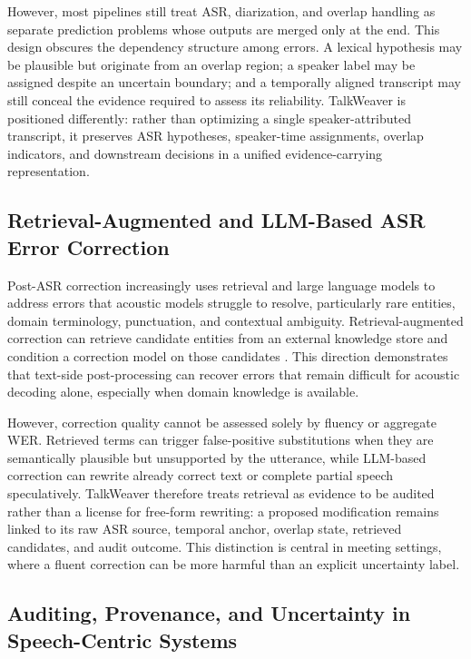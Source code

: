 \documentclass[10pt,twocolumn]{article}
\begin{document}
However, most pipelines still treat ASR, diarization, and overlap handling as separate prediction problems whose outputs are merged only at the end. This design obscures the dependency structure among errors. A lexical hypothesis may be plausible but originate from an overlap region; a speaker label may be assigned despite an uncertain boundary; and a temporally aligned transcript may still conceal the evidence required to assess its reliability. TalkWeaver is positioned differently: rather than optimizing a single speaker-attributed transcript, it preserves ASR hypotheses, speaker-time assignments, overlap indicators, and downstream decisions in a unified evidence-carrying representation.

\subsection{Retrieval-Augmented and LLM-Based ASR Error Correction}

Post-ASR correction increasingly uses retrieval and large language models to address errors that acoustic models struggle to resolve, particularly rare entities, domain terminology, punctuation, and contextual ambiguity. Retrieval-augmented correction can retrieve candidate entities from an external knowledge store and condition a correction model on those candidates \cite{pusateri2024retrieval}. This direction demonstrates that text-side post-processing can recover errors that remain difficult for acoustic decoding alone, especially when domain knowledge is available.

However, correction quality cannot be assessed solely by fluency or aggregate WER. Retrieved terms can trigger false-positive substitutions when they are semantically plausible but unsupported by the utterance, while LLM-based correction can rewrite already correct text or complete partial speech speculatively. TalkWeaver therefore treats retrieval as evidence to be audited rather than a license for free-form rewriting: a proposed modification remains linked to its raw ASR source, temporal anchor, overlap state, retrieved candidates, and audit outcome. This distinction is central in meeting settings, where a fluent correction can be more harmful than an explicit uncertainty label.

\subsection{Auditing, Provenance, and Uncertainty in Speech-Centric Systems}
\end{document}
